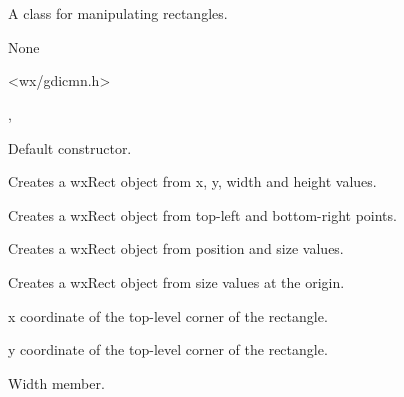 \section{}\label{wxrect}

A class for manipulating rectangles.


None


<wx/gdicmn.h>


, 



\label{wxrectctor}


Default constructor.


Creates a wxRect object from x, y, width and height values.


Creates a wxRect object from top-left and bottom-right points.


Creates a wxRect object from position and size values.


Creates a wxRect object from size values at the origin.


\label{wxrectx}


x coordinate of the top-level corner of the rectangle.


\label{wxrecty}


y coordinate of the top-level corner of the rectangle.


\label{wxrectwidth}


Width member.


\label{wxrectheight}


